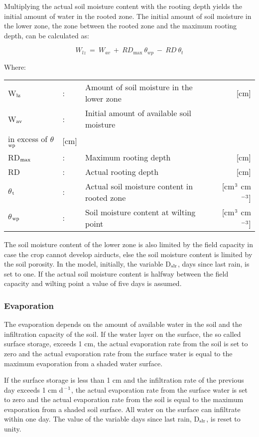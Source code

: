 Multiplying the actual soil moisture content with the rooting depth yields the initial
amount of water in the rooted zone. The initial amount of soil moisture in the lower zone,
the zone between the rooted zone and the maximum rooting depth, can be calculated as:

\begin{equation}
W_{lz} ~ =~ W _{av} ~+~ RD_{\max } ~\theta_{wp} ~-~RD~\theta_{t} 
\end{equation}

Where:\\
\begin{tabularx}{\textwidth}{llXr}
 W$_{{\rm lz}}$ &:& Amount of soil moisture in the lower zone & [cm]\\
 W$_{{\rm av}}$ &:& Initial amount of available soil moisture \\
    in excess of $\theta$$_{{\rm wp}}$ & [cm]\\
 RD$_{{\rm max}}$ &:& Maximum rooting depth & [cm]\\
 RD &:& Actual rooting depth & [cm]\\
 $\theta$$_{{\rm t}}$ &:& Actual soil moisture content in rooted zone  & [cm$^{{\rm 3}}$ cm$^{{\rm -3}}$]\\
 $\theta$$_{{\rm wp}}$ &:& Soil moisture content at wilting point  & [cm$^{{\rm 3}}$ cm$^{{\rm -3}}$]\\
\end{tabularx}

The soil moisture content of the lower zone is also limited by the field capacity in case
the crop cannot develop airducts, else the soil moisture content is limited by the soil
porosity. In the model, initially, the variable D$_{{\rm slr}}$, days since last rain, is set to one. If the
actual soil moisture content is halfway between the field capacity and wilting point a
value of five days is assumed. 

\subsubsection{Evaporation}
The evaporation depends on the amount of available water in the soil and the infiltration
capacity of the soil. If the water layer on the surface, the so called surface storage, 
exceeds 1 cm, the actual evaporation rate from the soil is set to zero and the actual
evaporation rate from the surface water is equal to the maximum evaporation from a
shaded water surface.

If the surface storage is less than 1 cm and the infiltration rate of the previous day
exceeds 1 cm d$^{{\rm -1}}$, the actual evaporation rate from the surface water is set to zero and the
actual evaporation rate from the soil is equal to the maximum evaporation from a shaded
soil surface. All water on the surface can infiltrate within one day. The value of the
variable days since last rain, D$_{{\rm slr}}$, is reset to unity.

